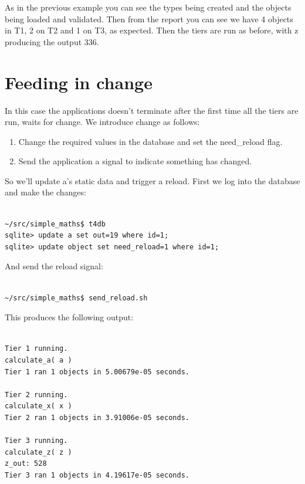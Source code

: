 \documentclass{report}
\begin{document}
As in the previous example you can see the types being created and the objects being loaded and validated. Then from the report you can see we have 4 objects in T1, 2 on T2 and 1 on T3, as expected. Then the tiers are run as before, with z producing the output 336.

\section{Feeding in change}

In this case the applications doesn't terminate after the first time all the tiers are run, waits for change. We introduce change as follows:

\begin{enumerate}

\item Change the required values in the database and set the need_reload flag.
\item Send the application a signal to indicate something has changed.

\end{enumerate}

So we'll update a's static data and trigger a reload. First we log into the database and make the changes:

\begin{verbatim}

~/src/simple_maths$ t4db
sqlite> update a set out=19 where id=1;
sqlite> update object set need_reload=1 where id=1;

\end{verbatim}

And send the reload signal:

\begin{verbatim}

~/src/simple_maths$ send_reload.sh

\end{verbatim}

This produces the following output:

\begin{verbatim}

Tier 1 running.
calculate_a( a )
Tier 1 ran 1 objects in 5.00679e-05 seconds.

Tier 2 running.
calculate_x( x )
Tier 2 ran 1 objects in 3.91006e-05 seconds.

Tier 3 running.
calculate_z( z )
z_out: 528
Tier 3 ran 1 objects in 4.19617e-05 seconds.

\end{verbatim}
\end{document}

